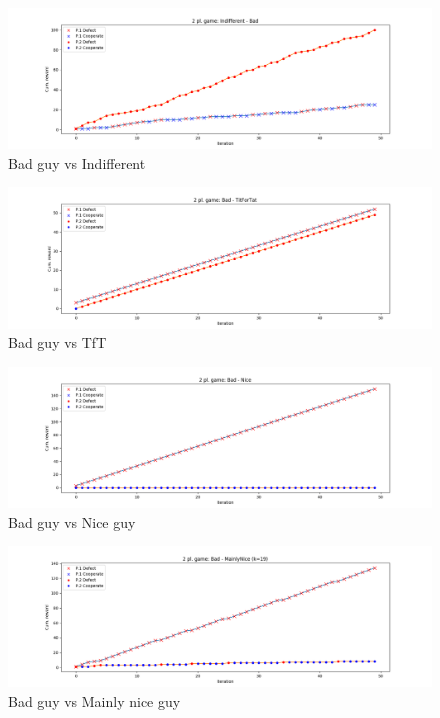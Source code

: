 \documentclass[journal,a4paper,10pt,twoside]{IEEEtran}
\begin{document}
\begin{figure}
    \centering
    \includegraphics[width=1\columnwidth]{img_v1/idp2p-rewards-Indifferent-Bad.png}
    \caption{Bad guy vs Indifferent}
    \label{fig:badvsindiff}
\end{figure}

\begin{figure}
    \centering
    \includegraphics[width=1\columnwidth]{img_v1/idp2p-rewards-Bad-TitForTat.png}
    \caption{Bad guy vs TfT}
    \label{fig:badvstft}
\end{figure}

\begin{figure}
    \centering
    \includegraphics[width=1\columnwidth]{img_v1/idp2p-rewards-Bad-Nice.png}
    \caption{Bad guy vs Nice guy}
    \label{fig:badvsnice}
\end{figure}

\begin{figure}
    \centering
    \includegraphics[width=1\columnwidth]{img_v1/idp2p-rewards-Bad-MainlyNice (k=19).png}
    \caption{Bad guy vs Mainly nice guy}
    \label{fig:badvsmainlynice}
\end{figure}
\end{document}

